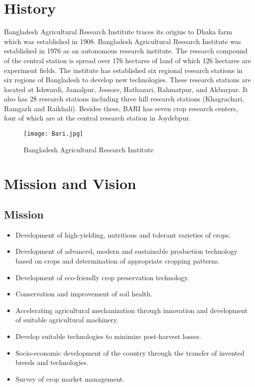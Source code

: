 \documentclass[oneside,12pt,fleqn]{book}
\begin{document}
\section{History}
Bangladesh Agricultural Research Institute traces its origins to Dhaka farm which was established in 1908. Bangladesh Agricultural Research Institute was established in 1976 as an autonomous research institute. The research compound of the central station is spread over 176 hectares of land of which 126 hectares are experiment fields. The institute has established six regional research stations in six regions of Bangladesh to develop new technologies. These research stations are located at Ishwardi, Jamalpur, Jessore, Hathazari, Rahmatpur, and Akbarpur. It also has 28 research stations including three hill research stations (Khagrachari, Ramgarh and Raikhali). Besides these, BARI has seven crop research centers, four of which are at the central research station in Joydebpur.
\begin{figure}[h!]
    \centering
    \texttt{[image: Bari.jpg]} %
    \caption{Bangladesh Agricultural Research Institute}
    \label{fig:sample} %
\end{figure}
\section{Mission and Vision}
\subsection{Mission}
\begin{itemize}
    \item Development of high-yielding, nutritious and tolerant varieties of crops.
    \item Development of advanced, modern and sustainable production technology based on crops and determination of appropriate cropping patterns.
    \item Development of eco-friendly crop preservation technology.
    \item Conservation and improvement of soil health.
    \item Accelerating agricultural mechanization through innovation and development of suitable agricultural machinery.
    \item Develop suitable technologies to minimize post-harvest losses.
    \item Socio-economic development of the country through the transfer of invented breeds and technologies.
    \item Survey of crop market management.
\end{itemize}
\end{document}
